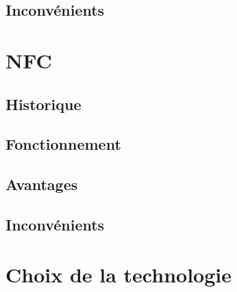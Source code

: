 \documentclass[a4paper,10pt]{report}
\begin{document}
    \subsection{Inconvénients}
  \section{NFC}
    \subsection{Historique}
    \subsection{Fonctionnement}
    \subsection{Avantages}
    \subsection{Inconvénients}
  \section{Choix de la technologie}
  
    
\end{document}
